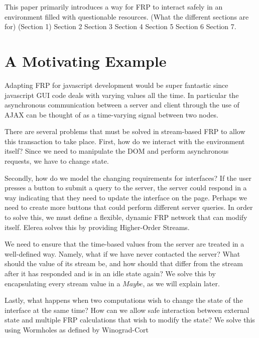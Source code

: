 \documentclass[twocolumn]{paper}
\begin{document}
This paper primarily introduces a way for FRP to interact safely in an environment filled with questionable resources. (What the different sections are for) (Section 1) Section 2 Section 3 Section 4 Section 5 Section 6 Section 7.

\section{A Motivating Example}
Adapting FRP for javascript development would be super fantastic since javascript GUI code deals with varying values all the time. In particular the asynchronous communication between a server and client through the use of AJAX can be thought of as a time-varying signal between two nodes. 

There are several problems that must be solved in stream-based FRP to allow this transaction to take place. First, how do we interact with the environment itself? Since we need to manipulate the DOM and perform asynchronous requests, we have to change state. 

Secondly, how do we model the changing requirements for interfaces? If the user presses a button to submit a query to the server, the server could respond in a way indicating that they need to update the interface on the page. Perhaps we need to create more buttons that could perform different server queries. In order to solve this, we must define a flexible, dynamic FRP network that can modify itself. Elerea solves this by providing Higher-Order Streams. 

We need to ensure that the time-based values from the server are treated in a well-defined way. Namely, what if we have never contacted the server? What should the value of its stream be, and how should that differ from the stream after it has responded and is in an idle state again? We solve this by encapsulating every stream value in a $Maybe$, as we will explain later. 

Lastly, what happens when two computations wish to change the state of the interface at the same time? How can we allow safe interaction between external state and multiple FRP calculations that wish to modify the state? We solve this using Wormholes as defined by Winograd-Cort \cite{WinogradCort2012HS}
\end{document}
